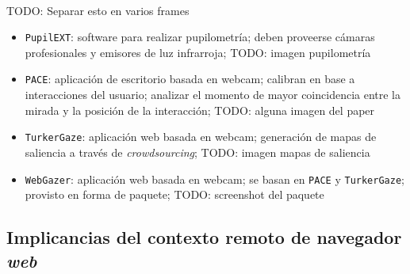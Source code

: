 \documentclass[aspectratio=169]{beamer}
\begin{document}
\begin{frame}{~}

  TODO: Separar esto en varios frames
  \begin{itemize}
    \item \texttt{PupilEXT}: software para realizar pupilometría; deben
      proveerse cámaras profesionales y emisores de luz infrarroja; TODO:
      imagen pupilometría

    \item \texttt{PACE}: aplicación de escritorio basada en webcam; calibran en
      base a interacciones del usuario; analizar el momento de mayor
      coincidencia entre la mirada y la posición de la interacción; TODO:
      alguna imagen del paper

    \item \texttt{TurkerGaze}: aplicación web basada en webcam; generación de
      mapas de saliencia a través de \textit{crowdsourcing}; TODO: imagen mapas
      de saliencia

    \item \texttt{WebGazer}: aplicación web basada en webcam; se basan en
      \texttt{PACE} y \texttt{TurkerGaze}; provisto en forma de paquete; TODO:
      screenshot del paquete

  \end{itemize}

\end{frame}

\subsection{Implicancias del contexto remoto de navegador \textit{web}}
\end{document}

